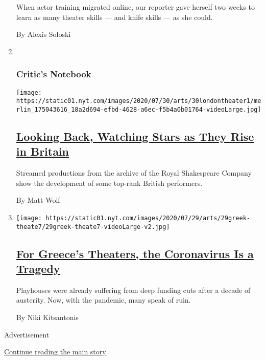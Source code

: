 \begin{enumerate}
  When actor training migrated online, our reporter gave herself two
  weeks to learn as many theater skills --- and knife skills --- as she
  could.

  By Alexis Soloski
\item ~
  \hypertarget{critics-notebook-1}{%
  \subsubsection{Critic's Notebook}\label{critics-notebook-1}}

  \texttt{[image: https://static01.nyt.com/images/2020/07/30/arts/30londontheater1/merlin\_175043616\_18a2d694-efbd-4628-a6ec-f5b4a0b01764-videoLarge.jpg]}

  \hypertarget{looking-back-watching-stars-as-they-rise-in-britain}{%
  \subsection{\texorpdfstring{\href{/2020/07/30/theater/patsy-ferran-michelle-terry-lucian-msamati.html}{Looking
  Back, Watching Stars as They Rise in
  Britain}}{Looking Back, Watching Stars as They Rise in Britain}}\label{looking-back-watching-stars-as-they-rise-in-britain}}

  Streamed productions from the archive of the Royal Shakespeare Company
  show the development of some top-rank British performers.

  By Matt Wolf
\item
  \texttt{[image: https://static01.nyt.com/images/2020/07/29/arts/29greek-theate7/29greek-theate7-videoLarge-v2.jpg]}

  \hypertarget{for-greeces-theaters-the-coronavirus-is-a-tragedy}{%
  \subsection{\texorpdfstring{\href{/2020/07/30/theater/greece-theater-austerity-coronavirus.html}{For
  Greece's Theaters, the Coronavirus Is a
  Tragedy}}{For Greece's Theaters, the Coronavirus Is a Tragedy}}\label{for-greeces-theaters-the-coronavirus-is-a-tragedy}}

  Playhouses were already suffering from deep funding cuts after a
  decade of austerity. Now, with the pandemic, many speak of ruin.

  By Niki Kitsantonis
\end{enumerate}

Advertisement

\protect\hyperlink{after-mid1}{Continue reading the main story}

